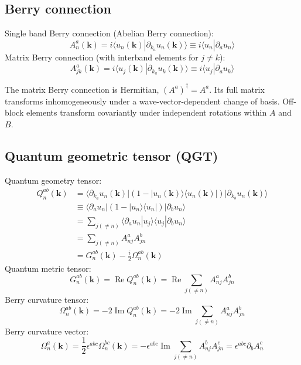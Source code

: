 \documentclass[prx,amsmath,amssymb,superscriptaddress,longbibliography]{revtex4-2}
\newcommand{\Rea}{\operatorname{Re}}
\newcommand{\Ima}{\operatorname{Im}}
\begin{document}
{
\subsection{Berry connection}

Single band Berry connection (Abelian Berry connection):
\begin{equation}
    A_n^a(\bm{k}) = i \langle u_n(\bm{k})| \partial_{k_a} u_n(\bm{k}) \rangle \equiv i \langle u_n| \partial_{a} u_n \rangle 
\label{eq:berry-connection}\end{equation}
Matrix Berry connection (with interband elements for $j\ne k$):
\begin{equation}
    A_{jk}^a(\bm{k}) = i \langle u_j(\bm{k})| \partial_{k_a} u_k(\bm{k}) \rangle \equiv i \langle u_j | \partial_{a} u_k \rangle 
\end{equation}

}
The matrix Berry connection is Hermitian, $(A^a)^\dagger=A^a$.
Its full matrix transforms inhomogeneously under a wave-vector-dependent
change of basis. Off-block elements transform covariantly under independent
rotations within $A$ and $B$.

\subsection{Quantum geometric tensor (QGT)}

Quantum geometry tensor: 
\begin{align}
     Q_{n}^{ab}(\bm{k}) &=  \langle{\partial_{k_a} u_n(\bm{k})}|(1 - |u_n(\bm{k})\rangle\langle{u_n(\bm{k})}|)|{\partial_{k_b} u_n(\bm{k})}\rangle \nonumber \\
     &\equiv \langle \partial_{a} u_n |(1 - |u_n\rangle\langle u_n |)|{\partial_{b} u_n}\rangle  \nonumber  \\
     &= \sum_{j(\neq n)}  \langle \partial_a u_n | u_j \rangle\langle u_j | \partial_b u_n \rangle \nonumber \\
     &= \sum_{j(\neq n)}  A_{nj}^a A_{jn}^b \nonumber \\
     &= G_n^{ab}(\bm{k}) - \frac{i}{2}\Omega_n^{ab}(\bm{k}) 
\label{eq:qgt}\end{align}
Quantum metric tensor: 
\begin{equation}
    G_{n}^{ab}(\bm{k}) = \Rea Q_{n}^{ab}(\bm{k}) = \Rea \sum_{j(\neq n)}  A_{nj}^a A_{jn}^b
\label{eq:metric-curvature}\end{equation}
Berry curvature tensor:
\begin{equation}
    \Omega_{n}^{ab}(\bm{k}) = -2\Ima Q_{n}^{ab}(\bm{k}) = -2 \Ima \sum_{j(\neq n)}  A_{nj}^a A_{jn}^b
\end{equation}
Berry curvature vector:
\begin{equation}
    \Omega_{n}^{a}(\bm{k}) = \frac{1}{2}\epsilon^{abc}\Omega_{n}^{bc}(\bm{k}) = -\epsilon^{abc} \Ima \sum_{j(\neq n)}  A_{nj}^b A_{jn}^c = \epsilon^{abc} \partial_b A_n^c
\label{eq:curvature-vector}\end{equation}
\end{document}
